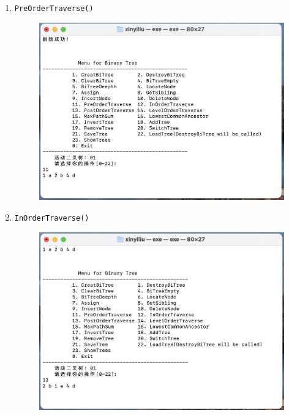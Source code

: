 \documentclass[supercite]{Experimental_Report}
\theoremstyle{definition}
\begin{document}
\begin{enumerate}
	\item \verb|PreOrderTraverse()|
		\begin{figure}[!htb]
			\includegraphics[width=0.8\linewidth]{images/img02/截屏2023-06-04 21.15.01.png}
		\end{figure}
		\FloatBarrier
	\newpage
	\item \verb|InOrderTraverse()|
		\begin{figure}[!htb]
			\includegraphics[width=0.8\linewidth]{images/img02/截屏2023-06-04 21.15.08.png}
		\end{figure}
	\FloatBarrier
	

\end{enumerate}
\end{document}
